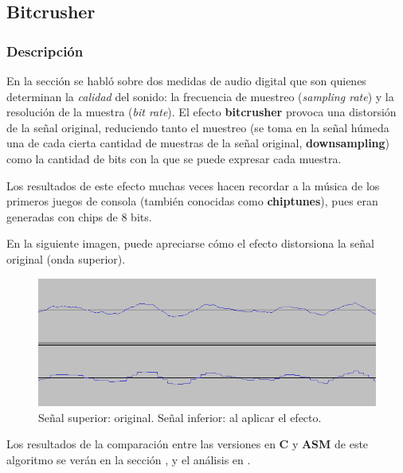 \subsection{Bitcrusher}
\label{subsec:desarrollo-bitcrusher}

\subsubsection{Descripción}
\label{subsec:desarrollo-bitcrusher-desc}
En la sección  se habló sobre dos medidas de audio digital que son quienes determinan la \textit{calidad} del sonido: la frecuencia de muestreo (\textit{sampling rate}) y la resolución de la muestra (\textit{bit rate}). El efecto \textbf{bitcrusher} provoca una distorsión de la señal original, reduciendo tanto el muestreo (se toma en la señal húmeda una de cada cierta cantidad de muestras de la señal original, \textbf{downsampling}) como la cantidad de bits con la que se puede expresar cada muestra.

Los resultados de este efecto muchas veces hacen recordar a la música de los primeros juegos de consola (también conocidas como \textbf{chiptunes}), pues eran generadas con chips de 8 bits.

En la siguiente imagen, puede apreciarse cómo el efecto distorsiona la señal original (onda superior).

\begin{figure}[H]
    \centering
    \includegraphics[scale=0.6]{imagenes/bitcrusher-signal.png}
    \caption{Señal superior: original. Señal inferior: al aplicar el efecto.}
    \label{fig:signals}
\end{figure}


\vspace{\baselineskip}

Los resultados de la comparación entre las versiones en \textbf{C} y \textbf{ASM} de este algoritmo se verán en la sección , y el análisis en .

